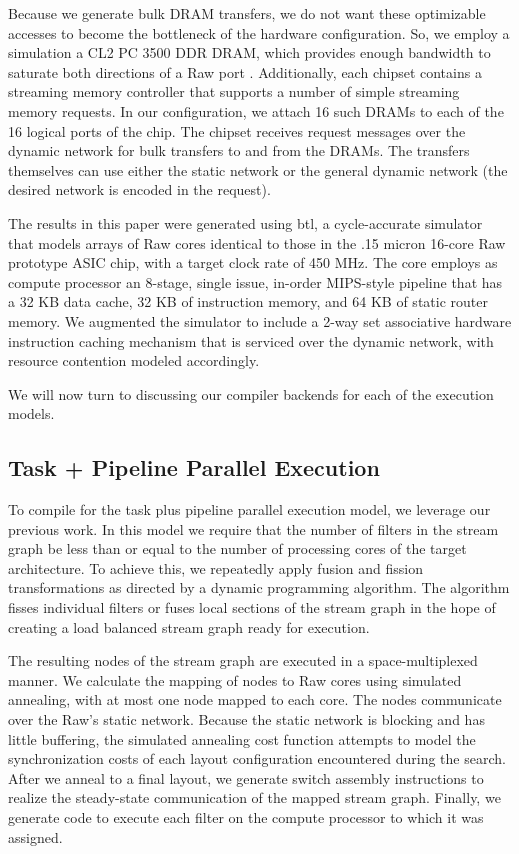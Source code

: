Because we generate bulk DRAM transfers, we do not want these
optimizable accesses to become the bottleneck of the hardware
configuration.  So, we employ a simulation a CL2 PC 3500 DDR DRAM,
which provides enough bandwidth to saturate both directions of a Raw
port \cite{raw_isca}.  Additionally, each chipset contains a streaming
memory controller that supports a number of simple streaming memory
requests. In our configuration, we attach 16 such DRAMs to each of the
16 logical ports of the chip.  The chipset receives request messages
over the dynamic network for bulk transfers to and from the DRAMs.
The transfers themselves can use either the static network or the
general dynamic network (the desired network is encoded in the
request).

The results in this paper were generated using btl, a cycle-accurate
simulator that models arrays of Raw cores identical to those in the
.15 micron 16-core Raw prototype ASIC chip, with a target clock rate
of 450 MHz. The core employs as compute processor an 8-stage, single
issue, in-order MIPS-style pipeline that has a 32 KB data cache, 32 KB
of instruction memory, and 64 KB of static router memory.  We
augmented the simulator to include a 2-way set associative hardware
instruction caching mechanism that is serviced over the dynamic
network, with resource contention modeled accordingly. 

We will now turn to discussing our compiler backends for each of the
execution models.

\subsection{Task + Pipeline Parallel Execution}
To compile for the task plus pipeline parallel execution model, we
leverage our previous work\cite{stream-asplos}. In this
model we require that the number of filters in the stream graph be
less than or equal to the number of processing cores of the
target architecture.  To achieve this, we repeatedly apply fusion and
fission transformations as directed by a dynamic programming
algorithm.  The algorithm fisses individual filters or fuses local
sections of the stream graph in the hope of creating a load balanced
stream graph ready for execution. 

The resulting nodes of the stream graph are executed in a
space-multiplexed manner.  We calculate the mapping of nodes to Raw
cores using simulated annealing, with at most one node mapped to each
core.  The nodes communicate over the Raw's static network.  Because
the static network is blocking and has little buffering, the simulated
annealing cost function attempts to model the synchronization costs of
each layout configuration encountered during the search.  After we
anneal to a final layout, we generate switch assembly instructions to
realize the steady-state communication of the mapped stream graph.
Finally, we generate code to execute each filter on the compute
processor to which it was assigned.

